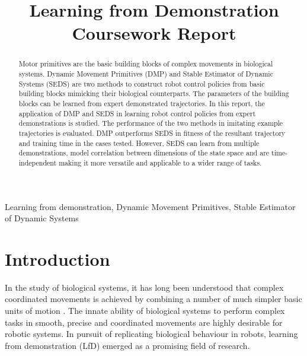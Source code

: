 \documentclass[conference]{IEEEtran}
\begin{document}
\title{Learning from Demonstration Coursework Report}

\author{
}

\maketitle

\begin{abstract}
    Motor primitives are the basic building blocks of complex movements in biological systems. Dynamic Movement Primitives (DMP) and Stable Estimator of Dynamic Systems (SEDS) are two methods to construct robot control policies from basic building blocks mimicking their biological counterparts. The parameters of the building blocks can be learned from expert demonstrated trajectories. In this report, the application of DMP and SEDS in learning robot control policies from expert demonstrations is studied. The performance of the two methods in imitating example trajectories is evaluated. DMP outperforms SEDS in fitness of the resultant trajectory and training time in the cases tested. However, SEDS can learn from multiple demonstrations, model correlation between dimensions of the state space and are time-independent making it more versatile and applicable to a wider range of tasks.
\end{abstract}

\begin{IEEEkeywords}
    Learning from demonstration, Dynamic Movement Primitives, Stable Estimator of Dynamic Systems
\end{IEEEkeywords}

\section{Introduction}

In the study of biological systems, it has long been understood that complex coordinated movements is achieved by combining a number of much simpler basic units of motion \cite{flashMotorPrimitivesVertebrates2005,mussa-ivaldiModularFeaturesMotor1999}. The innate ability of biological systems to perform complex tasks in smooth, precise and coordinated movements are highly desirable for robotic systems. In pursuit of replicating biological behaviour in robots, learning from demonstration (LfD) \cite{ravichandarRecentAdvancesRobot2020} emerged as a promising field of research.
\end{document}
